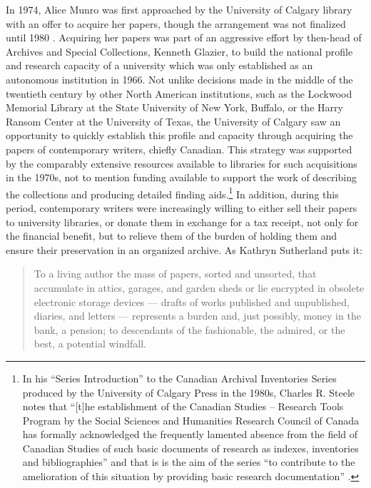 \documentclass{article}
\begin{document}
In 1974, Alice Munro was first approached by the University of Calgary library with an offer to acquire her papers, though the arrangement was not
finalized until 1980 \citep[xxix]{tener_archival_1986}. Acquiring her papers was
part of an aggressive effort by then-head of Archives and Special
Collections, Kenneth Glazier, to build the national profile and research
capacity of a university which was only established as an autonomous
institution in 1966. Not unlike decisions made in the middle of the
twentieth century by other North American institutions, such as the
Lockwood Memorial Library at the State University of New York, Buffalo,
or the Harry Ransom Center at the University of Texas, the University of
Calgary saw an opportunity to quickly establish this profile and
capacity through acquiring the papers of contemporary writers, chiefly
Canadian. This strategy was supported by the comparably extensive
resources available to libraries for such acquisitions in the 1970s, not
to mention funding available to support the work of describing the
collections and producing detailed finding aids.\footnote{In his
  ``Series Introduction'' to the Canadian Archival Inventories Series
  produced by the University of Calgary Press in the 1980s, Charles R.
  Steele notes that ``{[}t{]}he establishment of the Canadian Studies --
  Research Tools Program by the Social Sciences and Humanities Research
  Council of Canada has formally acknowledged the frequently lamented
  absence from the field of Canadian Studies of such basic documents of
  research as indexes, inventories and bibliographies'' and that is is
  the aim of the series ``to contribute to the amelioration of this
  situation by providing basic research documentation'' \citep[v]{steele_series_1986}.} In
addition, during this period, contemporary writers were increasingly
willing to either sell their papers to university libraries, or donate
them in exchange for a tax receipt, not only for the financial benefit,
but to relieve them of the burden of holding them and ensure their
preservation in an organized archive. As Kathryn Sutherland puts it:

\begin{quote}
To a living author the mass of papers, sorted and unsorted, that accumulate in attics, garages, and garden sheds or lie encrypted in obsolete electronic
storage devices –– drafts of works published and unpublished, diaries,
and letters –– represents a burden
and, just possibly, money in the bank, a pension; to descendants of the
fashionable, the admired, or the best, a potential windfall. 

\begin{flushright}
    \parencite[31]{sutherland_why_2022}
\end{flushright}
\end{quote}
\end{document}
